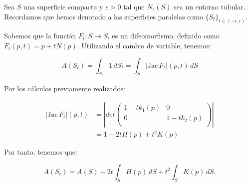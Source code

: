 \begin{remark}
Sea $S$ una superficie compacta y $\epsilon > 0$ tal que $N_\epsilon(S)$ sea un entorno tubular. Recordamos que hemos denotado a las superficies paralelas como $\{S_t\}_{t \in (-\epsilon, \epsilon)}$.

Sabemos que la función $F_t: S \longrightarrow S_t$ es un difeomorfismo, definido como $F_t(p, t) = p + tN(p)$. Utilizando el cambio de variable, tenemos:

\begin{equation*}
    A(S_t) = \int_{S_t} 1 \, dS_t = \int_S |\text{Jac} \, F_t|(p,t) \, dS
\end{equation*}

Por los cálculos previamente realizados:

\begin{align*}
    |\text{Jac} \, F_t|(p,t) &= \left|
  det \left( {\begin{array}{cc}
   1 - tk_1(p) & 0 \\
   0 & 1-tk_2(p) \\
  \end{array} } \right) \right| \\
  &= 1-2tH(p) + t^2K(p)
\end{align*}

Por tanto, tenemos que:

\begin{equation*}\label{areaparallelsurface}
    A(S_t) = A(S) -2t\int_{S} H(p) \, dS + t^2\int_{S} K(p) \, dS.
\end{equation*}
\end{remark}
